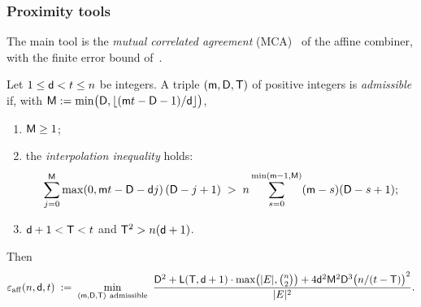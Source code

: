 
\subsubsection{Proximity tools}\label{sec:tools}

The main tool is the \emph{mutual correlated agreement} (MCA)~\cite{ACFY25} of the affine combiner, with the finite error bound of~\cite[Thm.~4.10]{CWYZ26}.

\begin{definition}\label{def:epsaff}
Let $1\le\mathsf{d}<t\le n$ be integers. A triple $(\mathsf{m},\mathsf{D},\mathsf{T})$ of positive integers is \emph{admissible} if, with $\mathsf{M}:=\min\bigl(\mathsf{D},\lfloor(\mathsf{m}t-\mathsf{D}-1)/\mathsf{d}\rfloor\bigr)$,
\begin{enumerate}[itemsep=1pt,label=(\roman*)]
\item $\mathsf{M}\ge1$;
\item the \emph{interpolation inequality} holds:
\[
\sum_{j=0}^{\mathsf{M}}\max(0,\mathsf{m}t-\mathsf{D}-\mathsf{d} j)\,(\mathsf{D}-j+1)\;>\;n\sum_{s=0}^{\min(\mathsf{m}-1,\mathsf{M})}(\mathsf{m}-s)(\mathsf{D}-s+1);
\]
\item $\mathsf{d}+1<\mathsf{T}<t$ and $\mathsf{T}^2>n(\mathsf{d}+1)$.
\end{enumerate}
Then
\[
\epsaff(\blen,\dgr,\agr)\;:=\;\min_{(\imul,\iyz,\ithr)\ \mathrm{admissible}}\ \frac{\iyz^2+\jl(\ithr,\dgr+1)\cdot\max\bigl(|\E|,\binom{\blen}{2}\bigr)+4\dgr^2\iz^2\iyz^3\bigl(\blen/(\agr-\ithr)\bigr)^2}{|\E|^2}.
\]
\end{definition}

